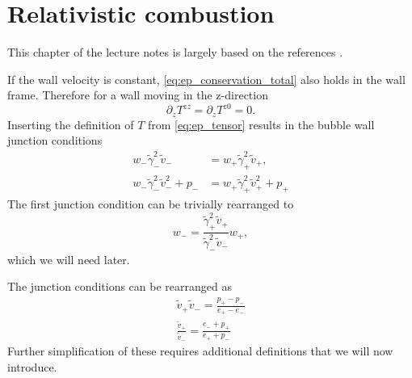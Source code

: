 \section{Relativistic combustion}
This chapter of the lecture notes is largely based on the references
\cites{hindmarsh_gw_pt_2019}{espinosa_energy_2010}.

If the wall velocity is constant, \eqref{eq:ep_conservation_total} also holds in the wall frame.
Therefore for a wall moving in the z-direction
\cite[eq. 7]{espinosa_energy_2010}
\begin{equation}
\partial_z T^{zz} = \partial_z T^{z0} = 0.
\end{equation}
Inserting the definition of $T$ from \eqref{eq:ep_tensor} results in the
bubble wall junction conditions
\cites[eq. 7.22]{lecture_notes}[eq. 135.2, 135.3]{landau_fluid_1987}
\begin{align}
w_- \tilde{\gamma}_-^2 \tilde{v}_- &= w_+ \tilde{\gamma}_+^2 \tilde{v}_+,
\label{eq:junction_condition_1} \\
w_- \tilde{\gamma}_-^2 \tilde{v}_-^2 + p_- &= w_+ \tilde{\gamma}_+^2 \tilde{v}_+^2 + p_+
\label{eq:junction_condition_2}
\end{align}
The first junction condition can be trivially rearranged to
\begin{equation}
w_- = \frac{\tilde{\gamma}_+^2 \tilde{v}_+}{\tilde{\gamma}_-^2 \tilde{v}_-} w_+,
\label{eq:wm_junction}
\end{equation}
which we will need later.

The junction conditions can be rearranged as
\cites[eq. 7.32]{lecture_notes}[eq. 4.134]{rezzolla_relativistic_2013}
\begin{align}
\tilde{v}_+ \tilde{v}_- = \frac{p_+ - p_-}{e_+ - e_-} \\
\frac{\tilde{v}_+}{\tilde{v}_-} = \frac{e_- + p_+}{e_+ + p_-}
\label{eq:junction_ep}
\end{align}
Further simplification of these requires additional definitions
that we will now introduce.


